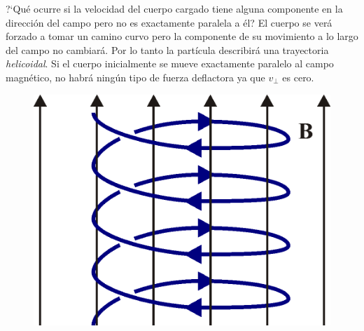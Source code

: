 \vspace{10mm}%
\begin{multicols}{2}
	\small{?`Qué ocurre si la velocidad del cuerpo cargado tiene alguna componente en la dirección del campo pero no es exactamente paralela a él? El cuerpo se verá forzado a tomar un camino curvo pero la componente de su movimiento a lo largo del campo no cambiará. Por lo tanto la partícula describirá una trayectoria \emph{helicoidal}. Si el cuerpo inicialmente se mueve exactamente paralelo al campo magnético, no habrá ningún tipo de fuerza deflactora ya que $v_\bot$ es cero.}
\begin{figure}[H]
	\centering
	\includegraphics[width=.3\textwidth]{imagenes/imagenes26/T26IM17.png}
	\end{figure}
\end{multicols}	

\vspace{10mm}%

